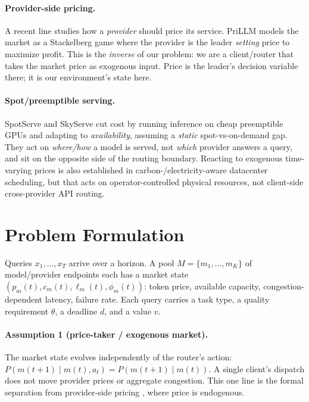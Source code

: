 \documentclass{article}
\begin{document}
\paragraph{Provider-side pricing.} A recent line studies how a \emph{provider} should price its
service. PriLLM \citep{prillm2025} models the market as a Stackelberg game where the provider is
the leader \emph{setting} price to maximize profit. This is the \emph{inverse} of our problem:
we are a client/router that takes the market price as exogenous input. Price is the leader's
decision variable there; it is our environment's state here.

\paragraph{Spot/preemptible serving.} SpotServe \citep{miao2024spotserve} and SkyServe
\citep{liu2025skyserve} cut cost by running inference on cheap preemptible GPUs and adapting to
\emph{availability}, assuming a \emph{static} spot-vs-on-demand gap. They act on
\emph{where/how} a model is served, not \emph{which} provider answers a query, and sit on the
opposite side of the routing boundary. Reacting to exogenous time-varying prices is also
established in carbon-/electricity-aware datacenter scheduling, but that acts on
operator-controlled physical resources, not client-side cross-provider API routing.

\section{Problem Formulation}\label{sec:form}
Queries $x_1,\dots,x_T$ arrive over a horizon. A pool $M=\{m_1,\dots,m_K\}$ of model/provider
endpoints each has a market state $(p_m(t),c_m(t),\ell_m(t),\phi_m(t))$: token price, available
capacity, congestion-dependent latency, failure rate. Each query carries a task type, a quality
requirement $\theta$, a deadline $d$, and a value $v$.

\paragraph{Assumption 1 (price-taker / exogenous market).} The market state evolves
independently of the router's action: $P(m(t{+}1)\mid m(t),a_t)=P(m(t{+}1)\mid m(t))$. A single
client's dispatch does not move provider prices or aggregate congestion. This one line is the
formal separation from provider-side pricing \citep{prillm2025}, where price is endogenous.
\end{document}
